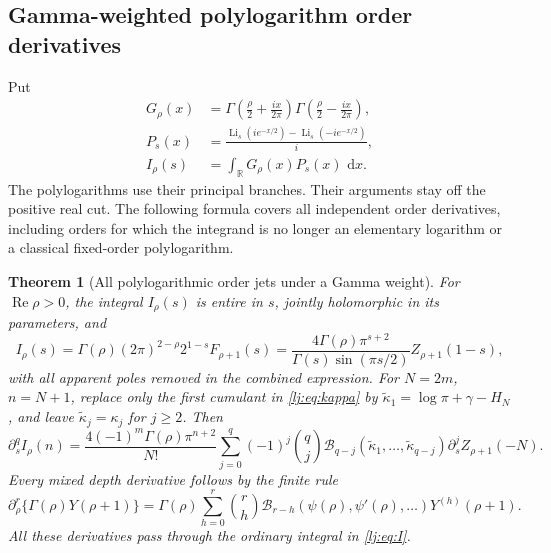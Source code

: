 \documentclass[11pt,a4paper]{article}
\numberwithin{equation}{section}
\newtheorem{theorem}{Theorem}[section]
\theoremstyle{definition}
\theoremstyle{remark}
\DeclareMathOperator{\re}{Re}
\newcommand{\dd}{\,\mathrm d}
\begin{document}
\subsection{Gamma-weighted polylogarithm order derivatives}

Put
\begin{align}
 G_\rho(x)&=
   \Gamma\left(\frac\rho2+\frac{ix}{2\pi}\right)
   \Gamma\left(\frac\rho2-\frac{ix}{2\pi}\right),\nonumber\\
 P_s(x)&=\frac{\operatorname{Li}_s(ie^{-x/2})
                    -\operatorname{Li}_s(-ie^{-x/2})}{i},\nonumber\\
 I_\rho(s)&=\int_{\mathbb R}G_\rho(x)P_s(x)\,\dd x.
 \label{lj:eq:I}
\end{align}
The polylogarithms use their principal branches. Their arguments stay
off the positive real cut. The following formula covers all independent
order derivatives, including orders for which the integrand is no longer
an elementary logarithm or a classical fixed-order polylogarithm.

\begin{theorem}[All polylogarithmic order jets under a Gamma weight]
\label{lj:thm:polylog}
For $\re\rho>0$, the integral $I_\rho(s)$ is entire in $s$, jointly
holomorphic in its parameters, and
\begin{equation}
 I_\rho(s)=\Gamma(\rho)(2\pi)^{2-\rho}2^{1-s}F_{\rho+1}(s)
 =\frac{4\Gamma(\rho)\pi^{s+2}}
        {\Gamma(s)\sin(\pi s/2)}Z_{\rho+1}(1-s),
 \label{lj:eq:Imaster}
\end{equation}
with all apparent poles removed in the combined expression.
For $N=2m$, $n=N+1$, replace only the first cumulant in
\eqref{lj:eq:kappa} by
$\widetilde\kappa_1=\log\pi+\gamma-H_N$, and leave
$\widetilde\kappa_j=\kappa_j$ for $j\geq2$. Then
\begin{equation}
 \partial_s^qI_\rho(n)=
 \frac{4(-1)^m\Gamma(\rho)\pi^{n+2}}{N!}
   \sum_{j=0}^q(-1)^j\binom qj
    \mathcal B_{q-j}(\widetilde\kappa_1,\ldots,
                    \widetilde\kappa_{q-j})
    \partial_s^jZ_{\rho+1}(-N).
 \label{lj:eq:Ijets}
\end{equation}
Every mixed depth derivative follows by the finite rule
\begin{equation}
 \partial_\rho^r\{\Gamma(\rho)Y(\rho+1)\}
 =\Gamma(\rho)\sum_{h=0}^r\binom rh
     \mathcal B_{r-h}(\psi(\rho),\psi'(\rho),\ldots)
     Y^{(h)}(\rho+1).
 \label{lj:eq:Igammajets}
\end{equation}
All these derivatives pass through the ordinary integral in
\eqref{lj:eq:I}.
\end{theorem}
\end{document}
